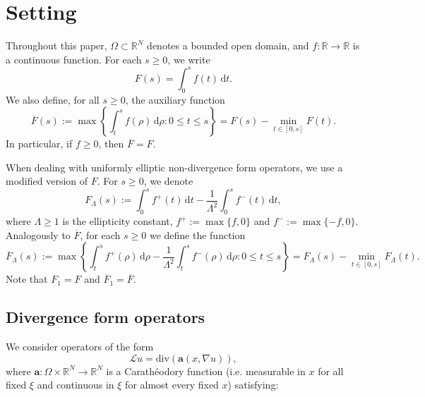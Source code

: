 \documentclass[10pt,twoside,english,reqno,a4paper]{amsart}
\theoremstyle{plain}
\theoremstyle{plain}
\theoremstyle{definition}
\theoremstyle{remark}
\numberwithin{equation}{section}
\newcommand{\R}{\mathbb{R}}
\def\div{\mathrm{div}}
\newcommand{\oF}{\overline{F}}
\begin{document}
\section{Setting}
\label{sec:setting}

Throughout this paper, $\Omega \subset \R^N$ denotes a bounded open domain, and $f : \R \to \R$ is a continuous function. For each $s\geq 0$, we write 
\[
F(s) = \int_0^sf(t)\, \mathrm{d}t.
\]
We also define, for all $s\geq 0$, the auxiliary function
\begin{equation}
    \label{eq:def_ov_F}
    \oF(s) := \max \left\{ \int_t^{s} f(\rho)\, \mathrm{d}\rho : 0\leq t\leq s \right\} = F(s) - \min_{t\in[0,s]} F(t).
\end{equation}
In particular, if $f\geq 0$, then $\oF = F$.

When dealing with uniformly elliptic non-divergence form operators, we use a modified version of $F$. For $s\geq 0$, we denote
\begin{equation}
    \label{eq:def_F_Lambda}
    F_\Lambda(s) := \int_0^s f^+(t)\,\mathrm{d}t 
    - \frac{1}{\Lambda^2}\int_0^s f^-(t)\,\mathrm{d}t,
\end{equation}
where $\Lambda \geq 1$ is the ellipticity constant, $f^+ := \max\{f,0\}$ and $f^- := \max\{-f,0\}$. Analogously to $\oF$, for each $s\geq 0$ we define the function
\begin{equation}
    \label{eq:def_ov_F_Lambda}
    \overline{F}_\Lambda(s) := \max \left\{ \int_t^s f^+(\rho) \, \mathrm{d}\rho - \frac{1}{\Lambda^2}\int_t^s f^-(\rho) \, \mathrm{d}\rho : 0 \leq t \leq s \right\} = F_\Lambda(s) - \min_{t\in[0,s]} F_\Lambda(t).
\end{equation}
Note that $F_1=F$ and $\oF_1 = \oF$.



\subsection{Divergence form operators}
We consider operators of the form 
\begin{equation*}
    \mathcal{L}u = \div(\mathbf{a}(x,\nabla u)),
\end{equation*}
where $\mathbf{a} : \Omega \times \R^N \to \R^N$ is a Carath\'eodory function (i.e. measurable in $x$ for all fixed $\xi$ and continuous in $\xi$ for almost every fixed $x$) satisfying:
\end{document}
